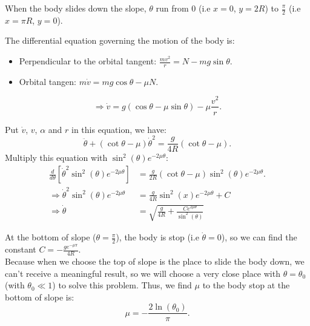 \documentclass[12pt]{article}
\begin{document}
\noindent When the body slides down the slope, $\theta$ run from $0$ (i.e $x=0$, $y= 2 R$) to $\frac{\pi}{2}$ (i.e $x= \pi R$, $y=0$).

\noindent The differential equation governing the motion of the body is:
\begin{itemize}
	\item Perpendicular to the orbital tangent: $\frac{m v^2}{r} = N - mg \sin \theta .$
	\item Orbital tangen: $ m \dot{v} = mg \cos \theta - \mu N.$
\end{itemize}	
$$\Rightarrow \dot{v} = g \left( \cos \theta - \mu \sin \theta \right) - \mu \frac{v^2}{r} .$$

\noindent Put $\dot{v}$, $v$, $\alpha$ and $r$ in this equation, we have:
$$ \ddot{\theta} + \left( \cot \theta - \mu \right) \dot{\theta}^2 = \frac{g}{4R} \left( \cot \theta - \mu \right) . $$
\noindent Multiply this equation with $ \sin^2 (\theta) e^{-2 \mu \theta}$:
\begin{align*}
	\frac{d}{d \theta} \left[ \dot{\theta}^2 \sin^2 (\theta) e^{-2 \mu \theta} \right] & = \frac{g}{2R} \left( \cot \theta - \mu \right) \sin^2 (\theta) e^{- 2 \mu \theta}. \\
	\Rightarrow \dot{\theta}^2 \sin^2 (\theta) e^{-2 \mu \theta} & = \frac{g}{4R} \sin^2 (x) e^{-2 \mu \theta} +C \\
	\Rightarrow \dot{\theta} & = \sqrt{ \frac{g}{4R} + \frac{C e^{2 \mu \theta}}{\sin^2 (\theta)}}
\end{align*}

\noindent At the bottom of slope ($\theta = \frac{\pi}{2}$), the body is stop (i.e $\dot{\theta} =0$), so we can find the constant $C = - \frac{g e^{-\mu \pi}}{4R}$. \\

\noindent Because when we choose the top of slope is the place to slide the body down, we can't receive a meaningful result, so we will choose a very close place with $\theta=\theta_0$  (with $\theta_0 \ll 1$) to solve this problem. Thus, we find $\mu$ to the body stop at the bottom of slope is:
$$ \mu = - \frac{2 \ln \left( \theta_0 \right) }{\pi} . $$
\end{document}
